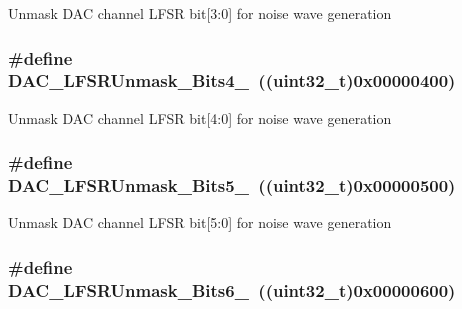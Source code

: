 Unmask DAC channel LFSR bit\mbox{[}3:0\mbox{]} for noise wave generation \hypertarget{group__DAC__lfsrunmask__triangleamplitude_ga2543d802e19d592a26c8231be663cdac}{
\subsubsection[{DAC\_\-LFSRUnmask\_\-Bits4\_\-0}]{\setlength{\rightskip}{0pt plus 5cm}\#define DAC\_\-LFSRUnmask\_\-Bits4\_~((uint32\_\-t)0x00000400)}}
\label{group__DAC__lfsrunmask__triangleamplitude_ga2543d802e19d592a26c8231be663cdac}
Unmask DAC channel LFSR bit\mbox{[}4:0\mbox{]} for noise wave generation \hypertarget{group__DAC__lfsrunmask__triangleamplitude_ga71a01660d410823bfe76a603080dc125}{
\subsubsection[{DAC\_\-LFSRUnmask\_\-Bits5\_\-0}]{\setlength{\rightskip}{0pt plus 5cm}\#define DAC\_\-LFSRUnmask\_\-Bits5\_~((uint32\_\-t)0x00000500)}}
\label{group__DAC__lfsrunmask__triangleamplitude_ga71a01660d410823bfe76a603080dc125}
Unmask DAC channel LFSR bit\mbox{[}5:0\mbox{]} for noise wave generation \hypertarget{group__DAC__lfsrunmask__triangleamplitude_ga48fe2d3f4274d6bf28e446ca0001ed5d}{
\subsubsection[{DAC\_\-LFSRUnmask\_\-Bits6\_\-0}]{\setlength{\rightskip}{0pt plus 5cm}\#define DAC\_\-LFSRUnmask\_\-Bits6\_~((uint32\_\-t)0x00000600)}}
\label{group__DAC__lfsrunmask__triangleamplitude_ga48fe2d3f4274d6bf28e446ca0001ed5d}
